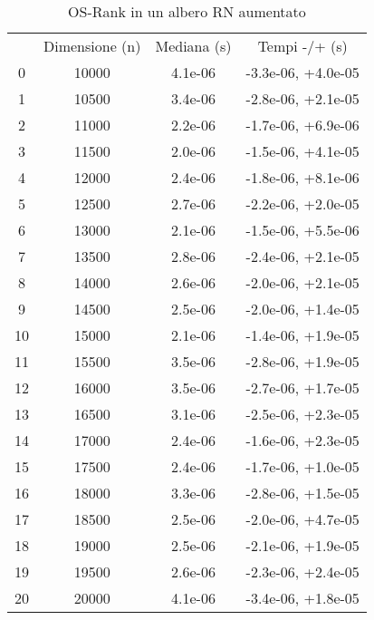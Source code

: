 \begin{table}
\centering
\caption{OS-Rank in un albero RN aumentato}
\label{OS-Rank in un albero RN aumentato}
\begin{adjustbox}{width=1\textwidth/2}
\begin{tabular}{|c|c|c|c|}
\hline
 & Dimensione (n) & Mediana (s) & Tempi -/+ (s) \\
0 & 10000 & 4.1e-06 & -3.3e-06, +4.0e-05 \\
\cline{1-4}
1 & 10500 & 3.4e-06 & -2.8e-06, +2.1e-05 \\
\cline{1-4}
2 & 11000 & 2.2e-06 & -1.7e-06, +6.9e-06 \\
\cline{1-4}
3 & 11500 & 2.0e-06 & -1.5e-06, +4.1e-05 \\
\cline{1-4}
4 & 12000 & 2.4e-06 & -1.8e-06, +8.1e-06 \\
\cline{1-4}
5 & 12500 & 2.7e-06 & -2.2e-06, +2.0e-05 \\
\cline{1-4}
6 & 13000 & 2.1e-06 & -1.5e-06, +5.5e-06 \\
\cline{1-4}
7 & 13500 & 2.8e-06 & -2.4e-06, +2.1e-05 \\
\cline{1-4}
8 & 14000 & 2.6e-06 & -2.0e-06, +2.1e-05 \\
\cline{1-4}
9 & 14500 & 2.5e-06 & -2.0e-06, +1.4e-05 \\
\cline{1-4}
10 & 15000 & 2.1e-06 & -1.4e-06, +1.9e-05 \\
\cline{1-4}
11 & 15500 & 3.5e-06 & -2.8e-06, +1.9e-05 \\
\cline{1-4}
12 & 16000 & 3.5e-06 & -2.7e-06, +1.7e-05 \\
\cline{1-4}
13 & 16500 & 3.1e-06 & -2.5e-06, +2.3e-05 \\
\cline{1-4}
14 & 17000 & 2.4e-06 & -1.6e-06, +2.3e-05 \\
\cline{1-4}
15 & 17500 & 2.4e-06 & -1.7e-06, +1.0e-05 \\
\cline{1-4}
16 & 18000 & 3.3e-06 & -2.8e-06, +1.5e-05 \\
\cline{1-4}
17 & 18500 & 2.5e-06 & -2.0e-06, +4.7e-05 \\
\cline{1-4}
18 & 19000 & 2.5e-06 & -2.1e-06, +1.9e-05 \\
\cline{1-4}
19 & 19500 & 2.6e-06 & -2.3e-06, +2.4e-05 \\
\cline{1-4}
20 & 20000 & 4.1e-06 & -3.4e-06, +1.8e-05 \\
\cline{1-4}
\end{tabular}
\end{adjustbox}
\end{table}

